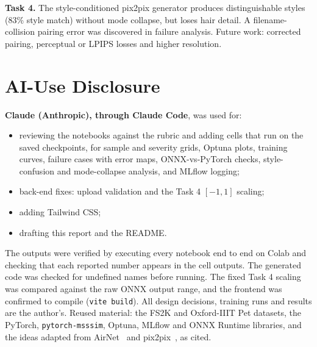 \documentclass[conference]{IEEEtran}
\begin{document}
\textbf{Task 4.} The style-conditioned pix2pix generator produces distinguishable styles (83\% style match) without mode collapse, but loses hair detail. A filename-collision pairing error was discovered in failure analysis. Future work: corrected pairing, perceptual or LPIPS losses and higher resolution.

\appendices
\section{AI-Use Disclosure}
\textbf{Claude (Anthropic), through Claude Code}, was used for:
\begin{itemize}
\item reviewing the notebooks against the rubric and adding cells that run on the saved checkpoints, for sample and severity grids, Optuna plots, training curves, failure cases with error maps, ONNX-vs-PyTorch checks, style-confusion and mode-collapse analysis, and MLflow logging;
\item back-end fixes: upload validation and the Task 4 $[-1,1]$ scaling;
\item adding Tailwind CSS;
\item drafting this report and the README.
\end{itemize}
The outputs were verified by executing every notebook end to end on Colab and checking that each reported number appears in the cell outputs. The generated code was checked for undefined names before running. The fixed Task 4 scaling was compared against the raw ONNX output range, and the frontend was confirmed to compile (\texttt{vite build}). All design decisions, training runs and results are the author's. Reused material: the FS2K and Oxford-IIIT Pet datasets, the PyTorch, \texttt{pytorch-msssim}, Optuna, MLflow and ONNX Runtime libraries, and the ideas adapted from AirNet~\cite{li2022airnet} and pix2pix~\cite{isola2017}, as cited.
\end{document}
